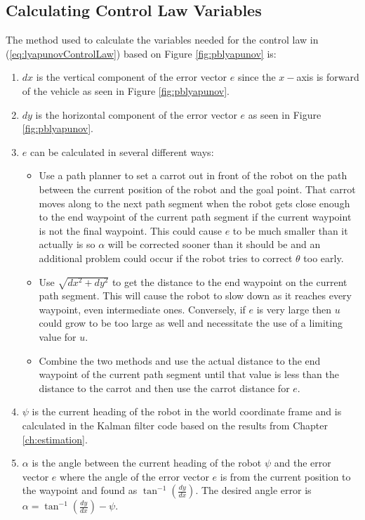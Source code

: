 \subsection{Calculating Control Law Variables}
\label{sec:lyapunovVariables}
The method used to calculate the variables needed for the control law in (\ref{eq:lyapunovControlLaw}) based on Figure \ref{fig:pblyapunov} is:
\begin{enumerate}
\item $dx$ is the vertical component of the error vector $e$ since the $x-$axis is forward of the vehicle as seen in Figure \ref{fig:pblyapunov}.
\item $dy$ is the horizontal component of the error vector $e$ as seen in Figure \ref{fig:pblyapunov}.
\item $e$ can be calculated in several different ways:
\begin{itemize}
\item Use a path planner to set a carrot out in front of the robot on the path between the current position of the robot and the goal point. That carrot moves along to the next path segment when the robot gets close enough to the end waypoint of the current path segment if the current waypoint is not the final waypoint. This could cause $e$ to be much smaller than it actually is so $\alpha$ will be corrected sooner than it should be and an additional problem could occur if the robot tries to correct $\theta$ too early.
\item Use $\sqrt{dx^2 + dy^2}$ to get the distance to the end waypoint on the current path segment. This will cause the robot to slow down as it reaches every waypoint, even intermediate ones. Conversely, if $e$ is very large then $u$ could grow to be too large as well and necessitate the use of a limiting value for $u$.
\item Combine the two methods and use the actual distance to the end waypoint of the current path segment until that value is less than the distance to the carrot and then use the carrot distance for $e$.
\end{itemize}
\item $\psi$ is the current heading of the robot in the world coordinate frame and is calculated in the Kalman filter code based on the results from Chapter \ref{ch:estimation}.
\item $\alpha$ is the angle between the current heading of the robot $\psi$ and the error vector $e$ where the angle of the error vector $e$ is from the current position to the waypoint and found as $\tan^{-1}\left(\frac{dy}{dx}\right)$. The desired angle error is $\alpha = \tan^{-1}\left(\frac{dy}{dx}\right) - \psi$.

\end{enumerate}
